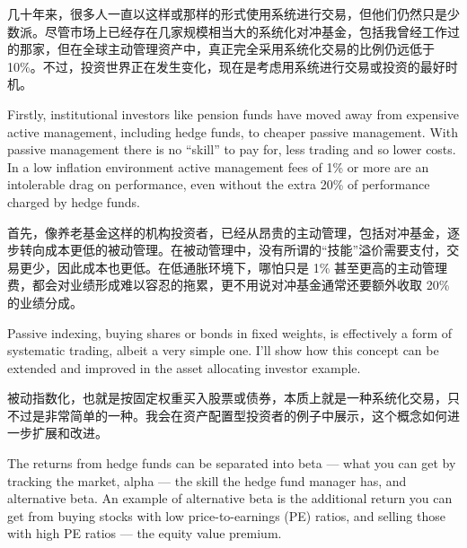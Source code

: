 \begin{chineseblock}几十年来，很多人一直以这样或那样的形式使用系统进行交易，但他们仍然只是少数派。尽管市场上已经存在几家规模相当大的系统化对冲基金，包括我曾经工作过的那家，但在全球主动管理资产中，真正完全采用系统化交易的比例仍远低于 10\%。不过，投资世界正在发生变化，现在是考虑用系统进行交易或投资的最好时机。\end{chineseblock}

\bipairgap

\begin{englishblock} Firstly, institutional investors like pension funds have moved away from expensive active management, including hedge funds, to cheaper passive management. With passive management there is no ``skill'' to pay for, less trading and so lower costs. In a low inflation environment active management fees of 1\% or more are an intolerable drag on performance, even without the extra 20\% of performance charged by hedge funds. \end{englishblock}

\begin{chineseblock}首先，像养老基金这样的机构投资者，已经从昂贵的主动管理，包括对冲基金，逐步转向成本更低的被动管理。在被动管理中，没有所谓的“技能”溢价需要支付，交易更少，因此成本也更低。在低通胀环境下，哪怕只是 1\% 甚至更高的主动管理费，都会对业绩形成难以容忍的拖累，更不用说对冲基金通常还要额外收取 20\% 的业绩分成。\end{chineseblock}

\bipairgap

\begin{englishblock} Passive indexing, buying shares or bonds in fixed weights, is effectively a form of systematic trading, albeit a very simple one. I'll show how this concept can be extended and improved in the asset allocating investor example. \end{englishblock}

\begin{chineseblock}被动指数化，也就是按固定权重买入股票或债券，本质上就是一种系统化交易，只不过是非常简单的一种。我会在资产配置型投资者的例子中展示，这个概念如何进一步扩展和改进。\end{chineseblock}

\bipairgap

\begin{englishblock} The returns from hedge funds can be separated into beta --- what you can get by tracking the market, alpha --- the skill the hedge fund manager has, and alternative beta. An example of alternative beta is the additional return you can get from buying stocks with low price-to-earnings (PE) ratios, and selling those with high PE ratios --- the equity value premium. \end{englishblock}

